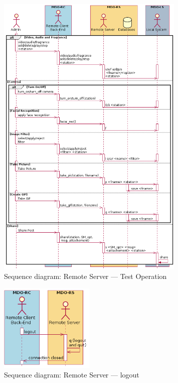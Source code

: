 \begin{figure}[htb!]
  \centering
  \includegraphics[width=0.8\textwidth]{img/seq-rs-test-op.png}%
  \caption{Sequence diagram: Remote Server --- Test Operation}%
  \label{fig:seq-rs-test-op}
\end{figure}

\begin{figure}[htb!]
  \centering
  \includegraphics[width=0.4\textwidth]{img/seq-rs-logout.png}%
  \caption{Sequence diagram: Remote Server --- logout}%
  \label{fig:seq-rs-logout}
\end{figure}

